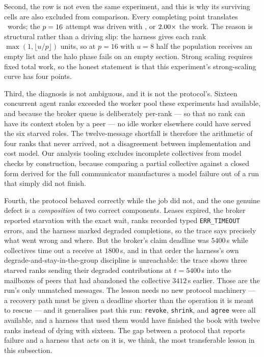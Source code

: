\documentclass[10pt,twocolumn]{article}
\theoremstyle{definition}
\theoremstyle{plain}
\newcommand{\code}[1]{\texttt{\small #1}}
\begin{document}
Second, the row is not even the same experiment, and this is why its surviving cells are
also excluded from comparison. Every completing point translates \NScalingBaseWords\
words; the $p=16$ attempt was driven with \NScalingFailedWords, or
$2.00\times$ the work. The reason is structural rather than a driving
slip: the harness gives each rank $\max(1, \lfloor u/p \rfloor)$ units, so at $p=16$
with $u=8$ half the population receives an empty list and the halo phase fails on an
empty section. Strong scaling requires fixed total work, so the honest statement is that
this experiment's strong-scaling curve has four points.

Third, the diagnosis is not ambiguous, and it is not the protocol's. Sixteen concurrent
agent ranks exceeded the worker pool these experiments had available, and because the
broker queue is deliberately per-rank --- so that no rank can have its context stolen by
a peer --- no idle worker elsewhere could have served the six starved roles. The
twelve-message shortfall is therefore the arithmetic of four ranks that never arrived,
not a disagreement between implementation and cost model. Our analysis tooling excludes
incomplete collectives from model checks by construction, because comparing a partial
collective against a closed form derived for the full communicator manufactures a model
failure out of a run that simply did not finish.

Fourth, the protocol behaved correctly while the job did not, and the one genuine defect
is a \emph{composition} of two correct components. Leases expired, the broker reported
starvation with the exact wait, ranks recorded typed \code{ERR\_TIMEOUT} errors, and the
harness marked degraded completions, so the trace says precisely what went wrong and
where. But the broker's claim deadline was $5400$\,s while collectives time out a receive
at $1800$\,s, and in that order the harness's own degrade-and-stay-in-the-group
discipline is unreachable: the trace shows three starved ranks sending their degraded
contributions at $t=5400$\,s into the mailboxes of peers that had abandoned the
collective $3412$\,s earlier. Those are the run's only unmatched messages. The lesson
needs no new protocol machinery --- a recovery path must be given a deadline shorter than
the operation it is meant to rescue --- and it generalises past this run: \code{revoke},
\code{shrink}, and \code{agree} were all available, and a harness that used them would
have finished the book with twelve ranks instead of dying with sixteen. The gap between a
protocol that reports failure and a harness that acts on it is, we think, the most
transferable lesson in this subsection.
\end{document}
